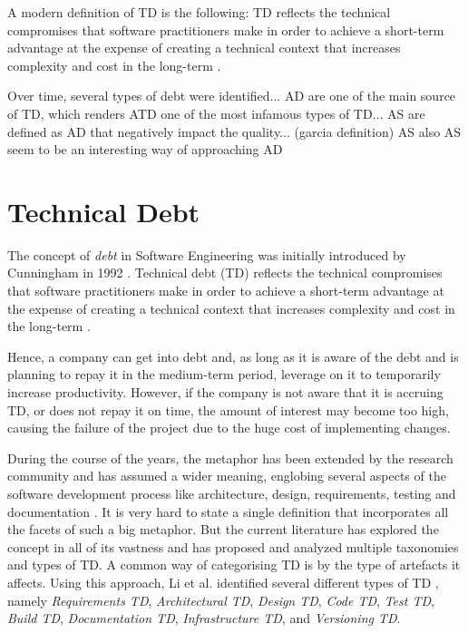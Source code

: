 
A modern definition of TD is the following: TD reflects the technical compromises that software practitioners make in order to achieve a short-term advantage at the expense of creating a technical context that increases complexity and cost in the long-term \cite{Avgeriou2016}. 

Over time, several types of debt were identified... 
AD are one of the main source of TD, which renders ATD one of the most infamous types of TD...
AS are defined as AD that negatively impact the quality... (garcia definition)
AS also 
AS seem to be an interesting way of approaching AD 


\section{Technical Debt}
The concept of \textit{debt} in Software Engineering was initially introduced by Cunningham in 1992 \cite{Cunningham1992}.
Technical debt (TD) reflects the technical compromises that software practitioners make in order to achieve a short-term advantage at the expense of creating a technical context that increases complexity and cost in the long-term \cite{Avgeriou2016}.  

Hence, a company can get into debt and, as long as it is aware of the debt and is planning to repay it in the medium-term period, leverage on it to temporarily increase productivity.
However, if the company is not aware that it is accruing TD, or does not repay it on time, the amount of interest may become too high, causing the failure of the project due to the huge cost of implementing changes.

During the course of the years, the metaphor has been extended by the research community and has assumed a wider meaning, englobing several aspects of the software development process like architecture, design, requirements, testing and documentation \cite{brown_managing_2010}.
It is very hard to state a single definition that incorporates all the facets of such a big metaphor. 
But the current literature has explored the concept in all of its vastness and has proposed and analyzed multiple taxonomies and types of TD.
A common way of categorising TD is by the type of artefacts it affects. Using this approach, Li et al. identified several different types of TD \cite{li_systematic_2015}, namely \emph{Requirements TD}, \emph{Architectural TD}, \emph{Design TD}, \emph{Code TD}, \emph{Test TD}, \emph{Build TD}, \emph{Documentation TD}, \emph{Infrastructure TD}, and \emph{Versioning TD}.




